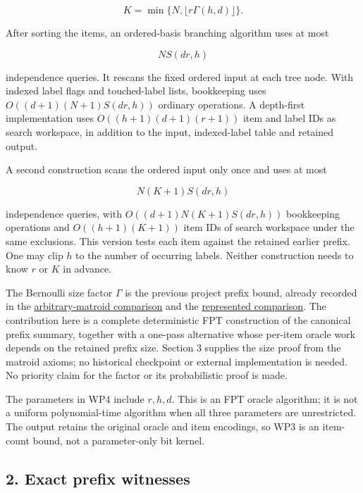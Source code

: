 \[
K=\min\{N,\lfloor r\Gamma(h,d)\rfloor\}.
\tag{WP3}
\]

After sorting the items, an ordered-basis branching algorithm uses at most

\[
NS(dr,h)
\tag{WP4}
\]

independence queries. It rescans the fixed ordered input at each tree node. With indexed label flags and touched-label lists, bookkeeping uses \(O((d+1)(N+1)S(dr,h))\) ordinary operations. A depth-first implementation uses \(O((h+1)(d+1)(r+1))\) item and label IDs as search workspace, in addition to the input, indexed-label table and retained output.

A second construction scans the ordered input only once and uses at most

\[
N(K+1)S(dr,h)
\tag{WP4a}
\]

independence queries, with \(O((d+1)N(K+1)S(dr,h))\) bookkeeping operations and \(O((h+1)(K+1))\) item IDs of search workspace under the same exclusions. This version tests each item against the retained earlier prefix. One may clip \(h\) to the number of occurring labels. Neither construction needs to know \(r\) or \(K\) in advance.

The Bernoulli size factor \(\Gamma\) is the previous project prefix bound, already recorded in the \href{https://github.com/icekylinx/algorithm-frontier/blob/main/problems/matroid-failure-summaries/manuscripts/arbitrary-matroid-and-submodular-failure-summaries.md\#8-antecedents-and-comparison-to-public-results}{arbitrary-matroid comparison} and the \href{https://github.com/icekylinx/algorithm-frontier/blob/main/problems/matroid-failure-summaries/manuscripts/sharp-represented-matroid-failure-summaries.md\#8-baselines-and-attribution-boundaries}{represented comparison}. The contribution here is a complete deterministic FPT construction of the canonical prefix summary, together with a one-pass alternative whose per-item oracle work depends on the retained prefix size. Section 3 supplies the size proof from the matroid axioms; no historical checkpoint or external implementation is needed. No priority claim for the factor or its probabilistic proof is made.

The parameters in WP4 include \(r,h,d\). This is an FPT oracle algorithm; it is not a uniform polynomial-time algorithm when all three parameters are unrestricted. The output retains the original oracle and item encodings, so WP3 is an item-count bound, not a parameter-only bit kernel.

\hypertarget{af-eb38c0014f-exact-prefix-witnesses}{%
\subsection{2. Exact prefix witnesses}\label{af-eb38c0014f-exact-prefix-witnesses}}


